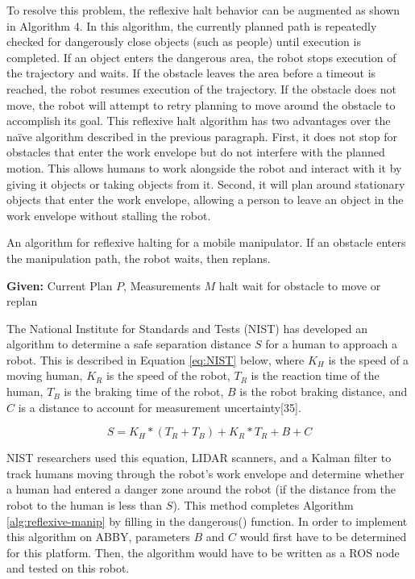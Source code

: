 \documentclass[]{cwru} %
\begin{document}
To resolve this problem, the reflexive halt behavior can be augmented as
shown in Algorithm 4. In this algorithm, the currently planned path is
repeatedly checked for dangerously close objects (such as people) until
execution is completed. If an object enters the dangerous area, the
robot stops execution of the trajectory and waits. If the obstacle
leaves the area before a timeout is reached, the robot resumes execution
of the trajectory. If the obstacle does not move, the robot will attempt
to retry planning to move around the obstacle to accomplish its goal.
This reflexive halt algorithm has two advantages over the naïve
algorithm described in the previous paragraph. First, it does not stop
for obstacles that enter the work envelope but do not interfere with the
planned motion. This allows humans to work alongside the robot and
interact with it by giving it objects or taking objects from it. Second,
it will plan around stationary objects that enter the work envelope,
allowing a person to leave an object in the work envelope without
stalling the robot.

\begin{algorithm}
\caption{An algorithm for reflexive halting for a mobile manipulator.
If an obstacle enters the manipulation path, the robot waits, then 
replans.}
\label{alg:reflexive-manip}
\begin{algorithmic}
\STATE \textbf{Given:} Current Plan $P$, Measurements $M$
      \STATE halt
      \STATE wait for obstacle to move or replan
    \ENDIF
  \ENDFOR
\ENDFOR
\end{algorithmic}
\end{algorithm}

The National Institute for Standards and Tests (NIST) has developed an
algorithm to determine a safe separation distance $S$ for a human to
approach a robot. This is described in Equation \ref{eq:NIST} below, where
$K_H$ is the speed of a moving human, $K_R$ is
the speed of the robot, $T_R$ is the reaction time of the
human, $T_B$ is the braking time of the robot, $B$ is the
robot braking distance, and $C$ is a distance to account for measurement
uncertainty{[}35{]}.

\begin{equation}
\label{eq:NIST}
S = K_{H} * ( T_{R} + T_{B} ) + K_{R} * T_{R} + B + C
\end{equation}

NIST researchers used this equation, LIDAR scanners, and a Kalman filter
to track humans moving through the robot's work envelope and determine
whether a human had entered a danger zone around the robot (if the
distance from the robot to the human is less than $S$). This method
completes Algorithm \ref{alg:reflexive-manip} by filling in the dangerous() function. In order
to implement this algorithm on ABBY, parameters $B$ and $C$ would first have
to be determined for this platform. Then, the algorithm would have to be
written as a ROS node and tested on this robot.

\backmatter



\end{document}

